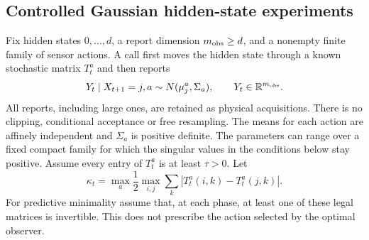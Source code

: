 \subsection{Controlled Gaussian hidden-state experiments}
Fix hidden states $0,\ldots,d$, a report dimension $m_{\rm obs}\ge d$, and a nonempty finite family of sensor actions. A call first moves the hidden state through a known stochastic matrix $T_t^a$ and then reports
\begin{equation}\label{eq:gaussianraw}
 Y_t\mid X_{t+1}=j,a\sim N(\mu_j^a,\Sigma_a),\qquad Y_t\in\mathbb R^{m_{\rm obs}}.
\end{equation}
All reports, including large ones, are retained as physical acquisitions. There is no clipping, conditional acceptance or free resampling. The means for each action are affinely independent and $\Sigma_a$ is positive definite. The parameters can range over a fixed compact family for which the singular values in the conditions below stay positive. Assume every entry of $T_t^a$ is at least $\tau>0$. Let
\[
 \kappa_t=\max_a\frac12\max_{i,j}\sum_k|T_t^a(i,k)-T_t^a(j,k)|.
\]
For predictive minimality assume that, at each phase, at least one of these legal matrices is invertible. This does not prescribe the action selected by the optimal observer.

